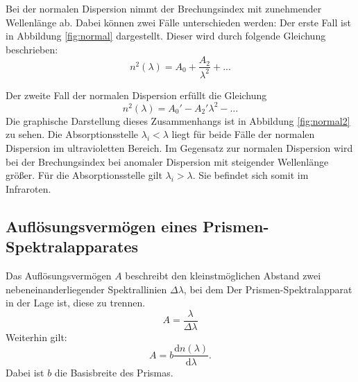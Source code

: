 Bei der normalen Dispersion nimmt der Brechungsindex mit zunehmender Wellenlänge ab. Dabei können zwei Fälle unterschieden werden:
Der erste Fall ist in Abbildung \ref{fig:normal} dargestellt. Dieser wird durch folgende Gleichung beschrieben:
\begin{equation}
  \label{eqn:normal1}
  n^2(\lambda)=A_0+\frac{A_2}{\lambda^2}+...
\end{equation}

Der zweite Fall der normalen Dispersion erfüllt die Gleichung
\begin{equation}
  \label{eqn:normal2}
  n^2(\lambda)=A_0'-A_2'\lambda^2-...
\end{equation}
Die graphische Darstellung dieses Zusammenhangs ist in Abbildung \ref{fig:normal2} zu sehen.
Die Absorptionsstelle $\lambda_i < \lambda$ liegt für beide Fälle der normalen Dispersion im ultravioletten Bereich.
\newline
Im Gegensatz zur normalen Dispersion wird bei der Brechungsindex bei anomaler Dispersion mit steigender Wellenlänge größer.
Für die Absorptionsstelle gilt $\lambda_i>\lambda$. Sie befindet sich somit im Infraroten.

\subsection{Auflösungsvermögen eines Prismen-Spektralapparates}
Das Auflösungsvermögen $A$ beschreibt den kleinstmöglichen Abstand zwei nebeneinanderliegender Spektrallinien $\Delta \lambda$, bei dem Der Prismen-Spektralapparat in der Lage ist, diese zu trennen.
\begin{equation}
  \label{eqn:A1}
  A=\frac{\lambda}{\Delta \lambda}
\end{equation}
Weiterhin gilt:
\begin{equation}
  \label{eqn:A2}
 A=b \frac{\mathrm{d}n(\lambda)}{\mathrm{d}\lambda}.
\end{equation}
Dabei ist $b$ die Basisbreite des Prismas.
